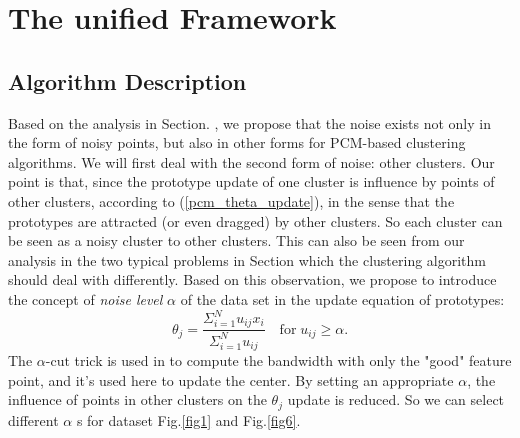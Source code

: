 \documentclass[journal]{IEEEtran}
\begin{document}
\section{The unified Framework}
\label{sec-4}
\subsection{Algorithm Description}
\label{sec-4-1}
Based on the analysis in Section. , we propose that the noise exists not only in the form of noisy points, but also in other forms for PCM-based clustering algorithms. We will first deal with the second form of noise: other clusters.
Our point is that, since the prototype update of one cluster is influence by points of other clusters, according to (\ref{pcm_theta_update}), in the sense that the prototypes are attracted (or even dragged) by other clusters. So each cluster can be seen as a noisy cluster to other clusters. This can also be seen from our analysis in the two typical problems in Section which the clustering algorithm should deal with differently. Based on this observation, we propose to introduce the concept of \emph{noise level} $\alpha$ of the data set in the update equation of prototypes:
\begin{equation}
\label{upcm_theta_update}
\theta_j=\frac{\Sigma_{i=1}^Nu_{ij}x_i}{\Sigma_{i=1}^Nu_{ij}} \quad \text{for}\;u_{ij}\geq \alpha.
\end{equation}
The $\alpha\text{-cut}$ trick is used in \cite{krishnapuram_possibilistic_1993} to compute the bandwidth with only the "good" feature point, and it's used here to update the center. By setting an appropriate $\alpha$, the influence of points in other clusters on the $\theta_j$ update is reduced. So we can select different $\alpha$ s for dataset Fig.\ref{fig1} and Fig.\ref{fig6}.
\end{document}
